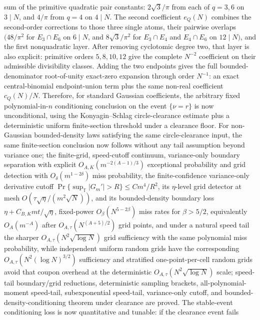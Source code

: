 \documentclass[11pt]{article}
\begin{document}
sum of the primitive quadratic pair constants: \(2\sqrt3/\pi\) from each of
\(q=3,6\) on \(3\mid N\), and \(4/\pi\) from \(q=4\) on \(4\mid N\).  The
second coefficient \(e_Q(N)\) combines the second-order corrections to those
three single atoms, their pairwise overlaps
\((48/\pi^2\) for \(E_3\cap E_6\) on \(6\mid N\), and \(8\sqrt3/\pi^2\) for
\(E_3\cap E_4\) and \(E_4\cap E_6\) on \(12\mid N)\), and the first
nonquadratic layer.  After removing cyclotomic degree two, that layer is also
explicit: primitive orders \(5,8,10,12\) give the complete \(N^{-2}\)
coefficient on their admissible divisibility classes.  Adding the two endpoints
gives the full bounded-denominator root-of-unity exact-zero expansion through
order \(N^{-1}\): an exact central-binomial endpoint-union term plus the same
non-real coefficient \(c_Q(N)/N\).
Therefore, for standard Gaussian coefficients, the arbitrary fixed
polynomial-in-\(n\) conditioning conclusion on the event \(\{\nu=r\}\) is now
unconditional, using the Konyagin--Schlag circle-clearance estimate plus a
deterministic uniform finite-section threshold under a clearance floor.  For
non-Gaussian bounded-density laws satisfying the same
circle-clearance input, the same finite-section conclusion now follows without
any tail assumption beyond variance one; the finite-grid, speed-cutoff
continuum, variance-only boundary separation with explicit
\(O_{A,K}(m^{-2(A-1)/3})\) exceptional probability and grid detection with
\(O_\delta(m^{1-2\delta})\) miss probability, the finite-confidence
variance-only derivative cutoff
\(\Pr\{\sup_{\mathbb T}|G_m'|>R\}\le Cm^4/R^2\), its
\(\eta\)-level grid detector at mesh
\(O(\tau\sqrt\eta/(m^2\sqrt N))\), and its bounded-density boundary loss
\(\eta+C_{B,K}mt/\sqrt\eta\), fixed-power
\(O_\beta(N^{5-2\beta})\) miss rates for \(\beta>5/2\), equivalently
\(O_A(m^{-A})\) after \(O_{A,\tau}(N^{(A+5)/2})\) grid points, and under a
natural speed tail the sharper \(O_{A,\tau}(N^2\sqrt{\log N})\) grid
sufficiency with the same polynomial miss probability, while independent
uniform random grids have the corresponding
\(O_{A,\tau}(N^2(\log N)^{3/2})\) sufficiency and stratified one-point-per-cell
random grids avoid that coupon overhead at the deterministic
\(O_{A,\tau}(N^2\sqrt{\log N})\) scale; speed-tail
boundary/grid reductions, deterministic sampling brackets, all-polynomial-moment speed-tail, subexponential
speed-tail, variance-only cutoff, and
bounded-density-conditioning theorem under clearance are proved.  The stable-event
conditioning loss is now quantitative and tunable: if the clearance event fails
\end{document}
